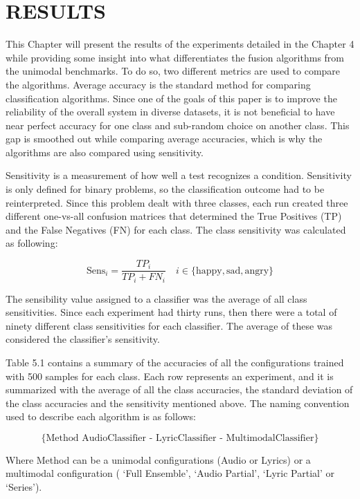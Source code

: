 \renewcommand{\chaptername}{}

\chapter{RESULTS}
 
This Chapter will present the results of the experiments detailed in the Chapter 4 while providing 
some insight into what differentiates the fusion algorithms from the unimodal benchmarks. To do 
so, two different metrics are used to compare the algorithms. Average accuracy is the standard 
method for comparing classification algorithms. Since one of the goals of this paper is to improve 
the reliability of the overall system in diverse datasets, it is not beneficial to have near perfect 
accuracy for one class and sub-random choice on another class. This gap is smoothed out while 
comparing average accuracies, which is why the algorithms are also compared using  sensitivity.

Sensitivity is a measurement of how well a test recognizes a condition. Sensitivity is only defined 
for binary problems, so the classification outcome had to be reinterpreted. Since this problem
dealt with three classes, each run created three different one-vs-all confusion matrices that determined the True Positives (TP) and the False Negatives (FN) for each class.  The class sensitivity was calculated as following:

\begin{equation}
\text{Sens}_{i} = \frac{TP_i}{TP_i +FN_i} \quad i \in \{\text{happy}, \text{sad}, \text{angry}\}
\end{equation}

The sensibility value assigned to a classifier was the average of all class sensitivities. Since each experiment had thirty runs, then there were a total of ninety different class sensitivities for each classifier. The average of these was considered the classifier's sensitivity.

Table 5.1 contains a summary of the accuracies of all the configurations trained with 500 samples 
for each class. Each row represents an experiment, and it is summarized with the average of all the class accuracies,
 the standard deviation of the class accuracies and the sensitivity mentioned above.  The naming convention used
 to describe each algorithm is as follows: 
 
 \[ \{\text{Method  AudioClassifier - LyricClassifier - MultimodalClassifier}\}  \]  
 
 Where Method can be a unimodal configurations (Audio or Lyrics) or a multimodal configuration 
 ( \lq Full Ensemble',  \lq Audio Partial', \lq Lyric Partial' or \lq Series').
 
